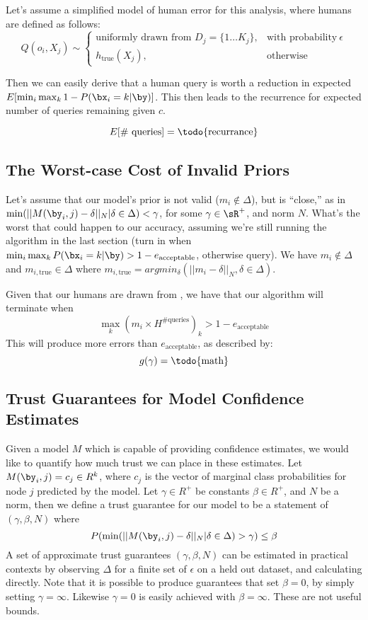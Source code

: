 Let's assume a simplified model of human error for this analysis, where humans are defined as follows:
\begin{equation}
    Q(o_i, X_j) \sim
    \begin{cases}
       \text{uniformly drawn from } D_j = \{1 \ldots K_j\}, & \text{with probability}\ \epsilon \\
      h_{\text{true}}(X_j), & \text{otherwise}
    \end{cases}
\end{equation}

Then we can easily derive that a human query is worth a  reduction in expected $E[\min_{i} \max_{k} 1-P(\bx_i = k | \by)]$.
This then leads to the recurrence for expected number of queries remaining given $c$.

\[E[\text{\# queries}] = \text{\todo{recurrance}}\]

\subsection{The Worst-case Cost of Invalid Priors}
\label{sec:worst-case}

Let's assume that our model's prior is not valid ($m_i \not\in \Delta$), but is ``close,'' as in $\min (||M(\by_i, j) - \delta||_N | \delta \in \Delta) < \gamma$, for some $\gamma \in \sR^+$, and norm $N$.
What's the worst that could happen to our accuracy, assuming we're still running the algorithm in the last section (turn in when $\min_{i} \max_{k} P(\bx_i = k | \by) > 1 - e_{\text{acceptable}}$, otherwise query).
We have $m_i \not\in \Delta$ and $m_{i,\text{true}} \in \Delta$ where $m_{i,\text{true}} = argmin_{\delta} (||m_i - \delta||_N, \delta \in \Delta)$.

Given that our humans are drawn from , we have that our algorithm will terminate when
\[\max_{k} (m_i \times H^{\text{\# queries}})_k > 1 - e_{\text{acceptable}}\]
This will produce more errors than $e_{\text{acceptable}}$, as described by:
\[g(\gamma) = \text{\todo{math}}\]

\subsection{Trust Guarantees for Model Confidence Estimates}

Given a model $M$ which is capable of providing confidence estimates, we would like to quantify how much trust we can place in these estimates.
Let $M(\by_i, j) = c_j \in R^k$, where $c_j$ is the vector of marginal class probabilities for node $j$ predicted by the model.
Let $\gamma \in R^+$ be constants $\beta \in R^+$, and $N$ be a norm, then we define a trust guarantee for our model to be a statement of $(\gamma, \beta, N)$ where
\[P(\min (||M(\by_i, j) - \delta||_N | \delta \in \Delta) > \gamma) \leq \beta\]
A set of approximate trust guarantees $(\gamma, \beta, N)$ can be estimated in practical contexts by observing $\Delta$ for a finite set of $\epsilon$ on a held out dataset, and calculating directly.
Note that it is possible to produce guarantees that set $\beta = 0$, by simply setting $\gamma = \infty$.
Likewise $\gamma = 0$ is easily achieved with $\beta = \infty$.
These are not useful bounds.

